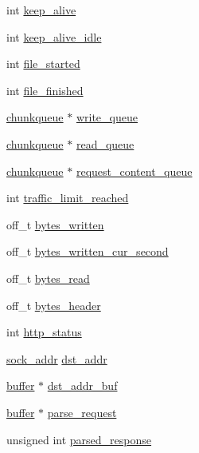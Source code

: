 \begin{DoxyCompactItemize}
\item 
int \hyperlink{structconnection_a3c26e699587345c2ab4039b4fbc5dd44}{keep\-\_\-alive}
\item 
int \hyperlink{structconnection_a60fbb1938d3a5f459b005b150f6dc9db}{keep\-\_\-alive\-\_\-idle}
\item 
int \hyperlink{structconnection_a86f6550572fa72ac814b35df1d6b890b}{file\-\_\-started}
\item 
int \hyperlink{structconnection_acf4d9c3f706cf8bd97c5453a211bb42e}{file\-\_\-finished}
\item 
\hyperlink{structchunkqueue}{chunkqueue} $\ast$ \hyperlink{structconnection_a79b48981e863f483d429bf5b6c1af617}{write\-\_\-queue}
\item 
\hyperlink{structchunkqueue}{chunkqueue} $\ast$ \hyperlink{structconnection_a1d21a149b6145872f687bbe27b1d90d6}{read\-\_\-queue}
\item 
\hyperlink{structchunkqueue}{chunkqueue} $\ast$ \hyperlink{structconnection_a08379ad329cc6e8f08732000d23992ec}{request\-\_\-content\-\_\-queue}
\item 
int \hyperlink{structconnection_a5fa0f8dc5c0b893683b4b092be217f50}{traffic\-\_\-limit\-\_\-reached}
\item 
off\-\_\-t \hyperlink{structconnection_a3f55620e6831c486b00beb2df653060e}{bytes\-\_\-written}
\item 
off\-\_\-t \hyperlink{structconnection_ab08325b9e7ce8208ba2f5ab8d030543c}{bytes\-\_\-written\-\_\-cur\-\_\-second}
\item 
off\-\_\-t \hyperlink{structconnection_a05f8c969aa3a06d3aed99c797c51bf88}{bytes\-\_\-read}
\item 
off\-\_\-t \hyperlink{structconnection_aa8743e91a38aa71d3fef9b0f7be115a4}{bytes\-\_\-header}
\item 
int \hyperlink{structconnection_a1fcd32a23ddbacfda74678d98fbf077f}{http\-\_\-status}
\item 
\hyperlink{unionsock__addr}{sock\-\_\-addr} \hyperlink{structconnection_a908b051bd40a4075c2502e75755aa62b}{dst\-\_\-addr}
\item 
\hyperlink{structbuffer}{buffer} $\ast$ \hyperlink{structconnection_ab67760a30c3d3819b625beb7bdd1e635}{dst\-\_\-addr\-\_\-buf}
\item 
\hyperlink{structbuffer}{buffer} $\ast$ \hyperlink{structconnection_a9f90ff4eab33e4bf140d0386165fbe87}{parse\-\_\-request}
\item 
unsigned int \hyperlink{structconnection_a24f4cb581343ebeb71a06bccf3eaa98d}{parsed\-\_\-response}
\item 

\end{DoxyCompactItemize}
